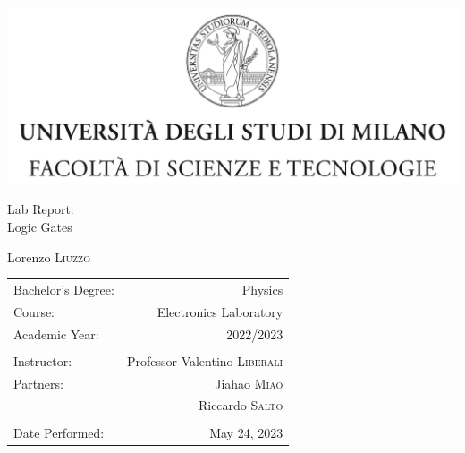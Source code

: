 \documentclass[
	a4paper, %
	10pt, %
]{report}
\begin{document}

	\begin{titlepage}
		\centering
		\vspace{1.5cm} %

			\includegraphics[width=1\textwidth]{figures/unimi.jpg} %

		\vspace{1.5cm}
			
			\Huge Lab Report:\\ Logic Gates %
			
		\vspace{1cm}
			
			\Large Lorenzo \textsc{Liuzzo} %
			
		\vspace{2cm}
		
			\begin{tabular}{l r}
			
				Bachelor's Degree: & Physics \\ %
				Course: & Electronics Laboratory \\ %
				Academic Year: & 2022/2023 \\ %
				\\
				Instructor: & Professor Valentino \textsc{Liberali} \\ %
				Partners: & Jiahao \textsc{Miao} \\ & Riccardo \textsc{Salto} \\ %
				\\
				Date Performed: & May 24, 2023 \\ %
				
			\end{tabular}

		\vfill %
	\end{titlepage}
\end{document}
